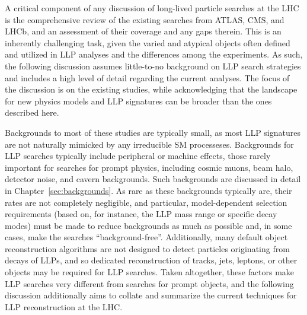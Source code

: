 

\noindent A critical component of any discussion of long-lived particle searches at the LHC is the comprehensive review of the existing searches from ATLAS, CMS, and LHCb, and an assessment of their coverage and any gaps therein. This is an inherently challenging task, given the varied and atypical objects often defined and utilized in LLP analyses and the differences among the experiments. As such, the following discussion assumes little-to-no background on LLP search strategies and includes a high level of detail regarding the current analyses. The focus of the discussion is on the existing studies, while acknowledging that the landscape for new physics models and LLP signatures can be broader than the ones described here.

Backgrounds to most of these studies are typically small, as most LLP signatures are not naturally mimicked by any irreducible SM processeses. Backgrounds for LLP searches typically include peripheral or machine effects, those rarely important for searches for prompt physics, including cosmic muons, beam halo, detector noise, and cavern backgrounds. Such backgrounds are discussed in detail in Chapter~\ref{sec:backgrounds}. As rare as these backgrounds typically are, their rates are not completely negligible, and particular, model-dependent selection requirements (based on, for instance, the LLP mass range or specific decay modes) must be made to reduce backgrounds as much as possible and, in some cases, make the searches ``background-free''. Additionally, many default object reconstruction algorithms are not designed to detect particles originating from decays of LLPs, and so dedicated reconstruction of tracks, jets, leptons, or other objects may be required for LLP searches. Taken altogether, these factors make LLP searches very different from searches for prompt objects, and the following discussion additionally aims to collate and summarize the current techniques for LLP reconstruction at the LHC.


